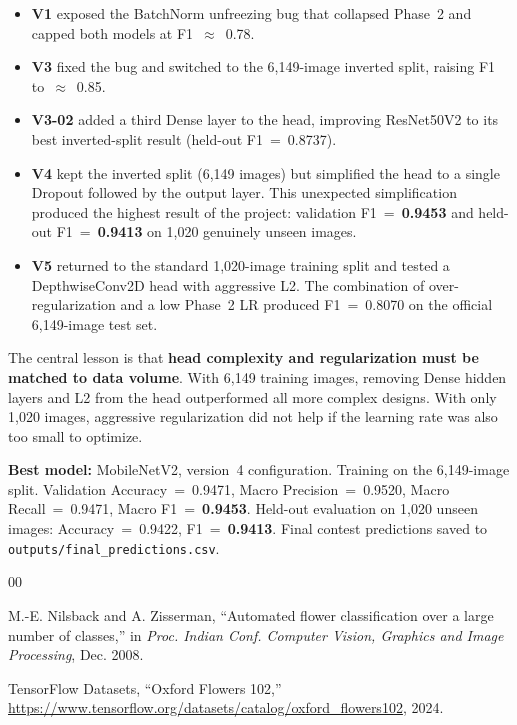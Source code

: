 \documentclass[conference]{IEEEtran}
\begin{document}
\begin{itemize}
  \item \textbf{V1} exposed the BatchNorm unfreezing bug that collapsed
    Phase~2 and capped both models at F1~$\approx$~0.78.
  \item \textbf{V3} fixed the bug and switched to the 6,149-image
    inverted split, raising F1 to~$\approx$~0.85.
  \item \textbf{V3-02} added a third Dense layer to the head,
    improving ResNet50V2 to its best inverted-split result
    (held-out F1~=~0.8737).
  \item \textbf{V4} kept the inverted split (6,149 images) but
    simplified the head to a single Dropout followed by the output
    layer. This unexpected simplification produced the highest result
    of the project: validation F1~=~\textbf{0.9453} and held-out
    F1~=~\textbf{0.9413} on 1,020 genuinely unseen images.
  \item \textbf{V5} returned to the standard 1,020-image training
    split and tested a DepthwiseConv2D head with aggressive L2. The
    combination of over-regularization and a low Phase~2 LR produced
    F1~=~0.8070 on the official 6,149-image test set.
\end{itemize}

The central lesson is that \textbf{head complexity and regularization
must be matched to data volume}. With 6,149 training images, removing
Dense hidden layers and L2 from the head outperformed all more complex
designs. With only 1,020 images, aggressive regularization did not
help if the learning rate was also too small to optimize.

\textbf{Best model:} MobileNetV2, version~4 configuration.
Training on the 6,149-image split.
Validation Accuracy~=~0.9471, Macro Precision~=~0.9520,
Macro Recall~=~0.9471, Macro F1~=~\textbf{0.9453}.
Held-out evaluation on 1,020 unseen images:
Accuracy~=~0.9422, F1~=~\textbf{0.9413}.
Final contest predictions saved to \texttt{outputs/final\_predictions.csv}.


\begin{thebibliography}{00}

M.-E. Nilsback and A. Zisserman, ``Automated flower classification over
a large number of classes,'' in \textit{Proc. Indian Conf. Computer
Vision, Graphics and Image Processing}, Dec. 2008.

TensorFlow Datasets, ``Oxford Flowers 102,''
\url{https://www.tensorflow.org/datasets/catalog/oxford_flowers102}, 2024.

\end{thebibliography}
\end{document}
